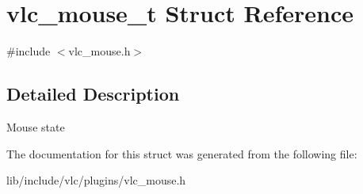 \hypertarget{structvlc__mouse__t}{}\section{vlc\+\_\+mouse\+\_\+t Struct Reference}
\label{structvlc__mouse__t}


{\ttfamily \#include $<$vlc\+\_\+mouse.\+h$>$}



\subsection{Detailed Description}
Mouse state 

The documentation for this struct was generated from the following file\+:\begin{DoxyCompactItemize}
\item 
lib/include/vlc/plugins/vlc\+\_\+mouse.\+h\end{DoxyCompactItemize}
